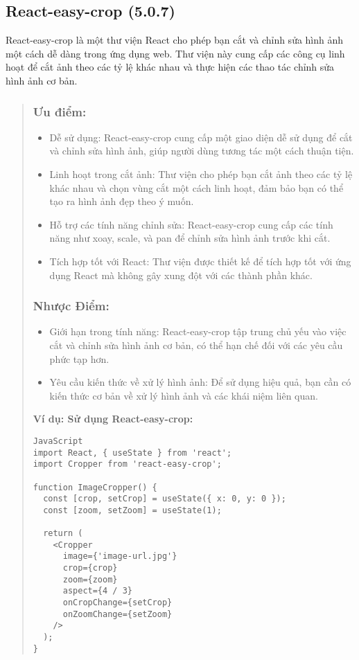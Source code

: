 \subsection{React-easy-crop (5.0.7)}

React-easy-crop là một thư viện React cho phép bạn cắt và chỉnh sửa hình ảnh một cách dễ dàng trong ứng dụng web. Thư viện này cung cấp các công cụ linh hoạt để cắt ảnh theo các tỷ lệ khác nhau và thực hiện các thao tác chỉnh sửa hình ảnh cơ bản.

\begin{quote}
\subsubsection{Ưu điểm:}
\begin{itemize}
  \item Dễ sử dụng: React-easy-crop cung cấp một giao diện dễ sử dụng để cắt và chỉnh sửa hình ảnh, giúp người dùng tương tác một cách thuận tiện.
  \item Linh hoạt trong cắt ảnh: Thư viện cho phép bạn cắt ảnh theo các tỷ lệ khác nhau và chọn vùng cắt một cách linh hoạt, đảm bảo bạn có thể tạo ra hình ảnh đẹp theo ý muốn.
  \item Hỗ trợ các tính năng chỉnh sửa: React-easy-crop cung cấp các tính năng như xoay, scale, và pan để chỉnh sửa hình ảnh trước khi cắt.
  \item Tích hợp tốt với React: Thư viện được thiết kế để tích hợp tốt với ứng dụng React mà không gây xung đột với các thành phần khác.
\end{itemize}

\subsubsection{Nhược Điểm:}
\begin{itemize}
  \item Giới hạn trong tính năng: React-easy-crop tập trung chủ yếu vào việc cắt và chỉnh sửa hình ảnh cơ bản, có thể hạn chế đối với các yêu cầu phức tạp hơn.
  \item Yêu cầu kiến thức về xử lý hình ảnh: Để sử dụng hiệu quả, bạn cần có kiến thức cơ bản về xử lý hình ảnh và các khái niệm liên quan.
\end{itemize}

\textbf{Ví dụ: Sử dụng React-easy-crop:}
\begin{lstlisting}
JavaScript
import React, { useState } from 'react';
import Cropper from 'react-easy-crop';

function ImageCropper() {
  const [crop, setCrop] = useState({ x: 0, y: 0 });
  const [zoom, setZoom] = useState(1);

  return (
    <Cropper
      image={'image-url.jpg'}
      crop={crop}
      zoom={zoom}
      aspect={4 / 3}
      onCropChange={setCrop}
      onZoomChange={setZoom}
    />
  );
}
\end{lstlisting}
\end{quote}


